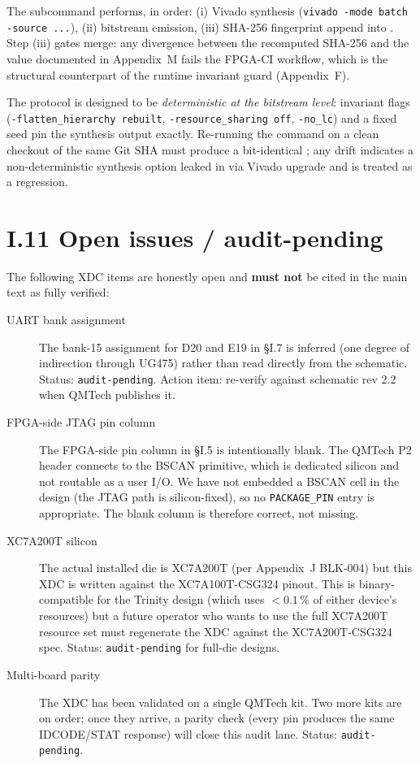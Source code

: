 The subcommand performs, in order: (i) Vivado synthesis (\texttt{vivado
-mode batch -source ...}), (ii) bitstream emission, (iii) SHA-256
fingerprint append into . Step (iii)
gates merge: any divergence between the recomputed SHA-256 and the
value documented in Appendix~M fails the FPGA-CI workflow, which is
the structural counterpart of the runtime invariant guard
(Appendix~F).

The protocol is designed to be \emph{deterministic at the bitstream
level}: invariant flags
(\texttt{-flatten\_hierarchy rebuilt}, \texttt{-resource\_sharing off},
\texttt{-no\_lc}) and a fixed seed pin the synthesis output exactly.
Re-running the command on a clean checkout of the same Git SHA must
produce a bit-identical ; any drift
indicates a non-deterministic synthesis option leaked in via Vivado
upgrade and is treated as a regression.

\section*{I.11 Open issues / audit-pending}
\label{sec:appI-open}

The following XDC items are honestly open and \textbf{must not} be
cited in the main text as fully verified:

\begin{description}
  \item[UART bank assignment] The bank-15 assignment for D20 and E19
    in \S I.7 is inferred (one degree of indirection through UG475)
    rather than read directly from the schematic. Status:
    \texttt{audit-pending}. Action item: re-verify against schematic
    rev 2.2 when QMTech publishes it.
  \item[FPGA-side JTAG pin column] The FPGA-side pin column in
    \S I.5 is intentionally blank. The QMTech P2 header connects
    to the BSCAN primitive, which is dedicated silicon and not
    routable as a user I/O. We have not embedded a BSCAN cell in
    the design (the JTAG path is silicon-fixed), so no
    \texttt{PACKAGE\_PIN} entry is appropriate. The blank column
    is therefore correct, not missing.
  \item[XC7A200T silicon] The actual installed die is XC7A200T
    (per Appendix~J BLK-004) but this XDC is written against the
    XC7A100T-CSG324 pinout. This is binary-compatible for the
    Trinity design (which uses $< 0.1$\,\% of either device's
    resources) but a future operator who wants to use the full
    XC7A200T resource set must regenerate the XDC against the
    XC7A200T-CSG324 spec. Status: \texttt{audit-pending} for
    full-die designs.
  \item[Multi-board parity] The XDC has been validated on a single
    QMTech kit. Two more kits are on order; once they arrive, a
    parity check (every pin produces the same IDCODE/STAT response)
    will close this audit lane. Status: \texttt{audit-pending}.
\end{description}

